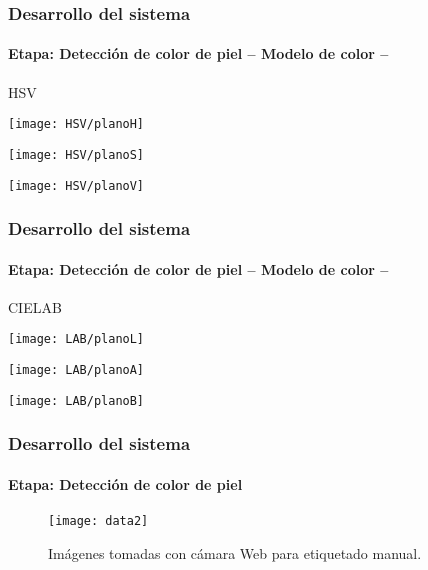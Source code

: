 \documentclass[xcolor=dvipsnames]{beamer}
\begin{document}
	\begin{frame}
		\transdissolve
		\frametitle{Desarrollo del sistema}
		\framesubtitle{Etapa: Detección de color de piel -- Modelo de color --}
		HSV
		
		\begin{center}
			\begin{minipage}[c]{.3\textwidth}
				\texttt{[image: HSV/planoH]}
			\end{minipage}
			\begin{minipage}[c]{.3\textwidth}
				\texttt{[image: HSV/planoS]}
			\end{minipage}
			\begin{minipage}[c]{.3\textwidth}
				\texttt{[image: HSV/planoV]}
			\end{minipage}
		\end{center}
	\end{frame}

	\begin{frame}
		\transdissolve
		\frametitle{Desarrollo del sistema}
		\framesubtitle{Etapa: Detección de color de piel -- Modelo de color --}
		CIELAB
		
		\begin{center}
			\begin{minipage}[c]{.3\textwidth}
				\texttt{[image: LAB/planoL]}
			\end{minipage}
			\begin{minipage}[c]{.3\textwidth}
				\texttt{[image: LAB/planoA]}
			\end{minipage}
			\begin{minipage}[c]{.3\textwidth}
				\texttt{[image: LAB/planoB]}
			\end{minipage}
		\end{center}
	\end{frame}

	\begin{frame}
		\transdissolve
		\frametitle{Desarrollo del sistema}
		\framesubtitle{Etapa: Detección de color de piel}
		\begin{center}
			\begin{figure}[h]
			\texttt{[image: data2]}
			\caption{Imágenes tomadas con cámara Web para etiquetado manual.}
			\end{figure}
		\end{center}
	\end{frame}
\end{document}
